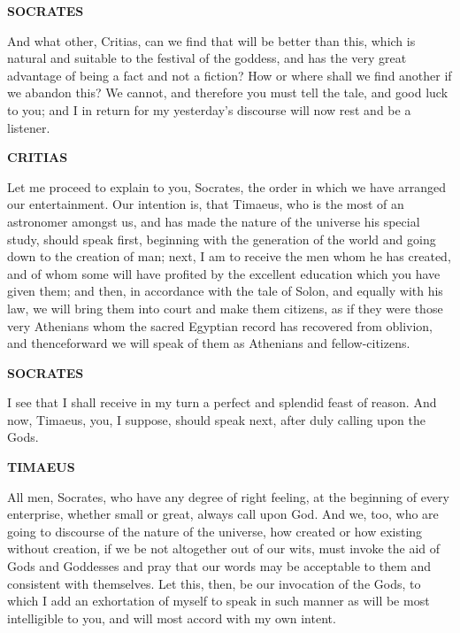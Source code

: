 \documentclass[11pt,letter]{article}
\begin{document}
\par \textbf{SOCRATES}
\par   And what other, Critias, can we find that will be better than this, which is natural and suitable to the festival of the goddess, and has the very great advantage of being a fact and not a fiction? How or where shall we find another if we abandon this? We cannot, and therefore you must tell the tale, and good luck to you; and I in return for my yesterday’s discourse will now rest and be a listener.

\par \textbf{CRITIAS}
\par   Let me proceed to explain to you, Socrates, the order in which we have arranged our entertainment. Our intention is, that Timaeus, who is the most of an astronomer amongst us, and has made the nature of the universe his special study, should speak first, beginning with the generation of the world and going down to the creation of man; next, I am to receive the men whom he has created, and of whom some will have profited by the excellent education which you have given them; and then, in accordance with the tale of Solon, and equally with his law, we will bring them into court and make them citizens, as if they were those very Athenians whom the sacred Egyptian record has recovered from oblivion, and thenceforward we will speak of them as Athenians and fellow-citizens.

\par \textbf{SOCRATES}
\par   I see that I shall receive in my turn a perfect and splendid feast of reason. And now, Timaeus, you, I suppose, should speak next, after duly calling upon the Gods.

\par \textbf{TIMAEUS}
\par   All men, Socrates, who have any degree of right feeling, at the beginning of every enterprise, whether small or great, always call upon God. And we, too, who are going to discourse of the nature of the universe, how created or how existing without creation, if we be not altogether out of our wits, must invoke the aid of Gods and Goddesses and pray that our words may be acceptable to them and consistent with themselves. Let this, then, be our invocation of the Gods, to which I add an exhortation of myself to speak in such manner as will be most intelligible to you, and will most accord with my own intent.
\end{document}
